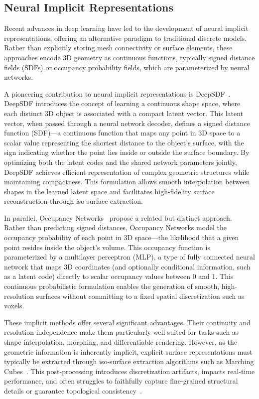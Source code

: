 \subsection{Neural Implicit Representations}
Recent advances in deep learning have led to the development of neural implicit representations, offering an alternative paradigm to traditional discrete models.
Rather than explicitly storing mesh connectivity or surface elements, these approaches encode 3D geometry as continuous functions, typically signed distance fields (SDFs) or occupancy probability fields, which are parameterized by neural networks.

A pioneering contribution to neural implicit representations is DeepSDF~\cite{Park2019}.
DeepSDF introduces the concept of learning a continuous shape space, where each distinct 3D object is associated with a compact latent vector.
This latent vector, when passed through a neural network decoder, defines a signed distance function (SDF)—a continuous function that maps any point in 3D space to a scalar value representing the shortest distance to the object's surface, with the sign indicating whether the point lies inside or outside the surface boundary.
By optimizing both the latent codes and the shared network parameters jointly, DeepSDF achieves efficient representation of complex geometric structures while maintaining compactness.
This formulation allows smooth interpolation between shapes in the learned latent space and facilitates high-fidelity surface reconstruction through iso-surface extraction.

In parallel, Occupancy Networks~\cite{mescheder2019occupancy} propose a related but distinct approach.
Rather than predicting signed distances, Occupancy Networks model the occupancy probability of each point in 3D space—the likelihood that a given point resides inside the object's volume.
This occupancy function is parameterized by a multilayer perceptron (MLP), a type of fully connected neural network that maps 3D coordinates (and optionally conditional information, such as a latent code) directly to scalar occupancy values between 0 and 1.
This continuous probabilistic formulation enables the generation of smooth, high-resolution surfaces without committing to a fixed spatial discretization such as voxels.

These implicit methods offer several significant advantages.
Their continuity and resolution-independence make them particularly well-suited for tasks such as shape interpolation, morphing, and differentiable rendering.
However, as the geometric information is inherently implicit, explicit surface representations must typically be extracted through iso-surface extraction algorithms such as Marching Cubes~\cite{lorensen1987marching}.
This post-processing introduces discretization artifacts, impacts real-time performance, and often struggles to faithfully capture fine-grained structural details or guarantee topological consistency~\cite{sitzmann2020implicit}.

